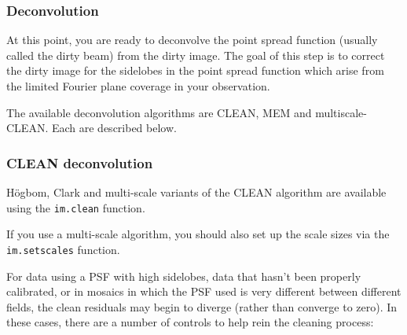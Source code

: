 \subsubsection{Deconvolution}
\label{subsubsection:synth.im.deconvolution}

At this point, you are ready to deconvolve the point spread function
(usually called the dirty beam) from the dirty image.  The goal of
this step is to correct the dirty image for the sidelobes in the point
spread function which arise from the limited Fourier plane coverage in
your observation.

The available deconvolution algorithms are CLEAN, MEM and
multiscale-CLEAN.  Each are described below.  

\subsubsection{CLEAN deconvolution} 
\label{subsubsection:synth.im.clean}

H\"ogbom, Clark and multi-scale variants of the CLEAN algorithm are
available using the {\tt im.clean} function.

If you use a multi-scale algorithm, you should also set up the scale
sizes via the {\tt im.setscales} function.

\vspace{3mm}

For data using a PSF with high sidelobes, data that hasn't been
properly calibrated, or in mosaics in which the PSF used is very
different between different fields, the clean residuals may begin to
diverge (rather than converge to zero). In these cases, there are a
number of controls to help rein the cleaning process:

